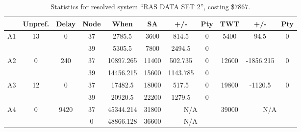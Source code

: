\begin{sidewaystable}
\footnotesize
\caption{Statistics for resolved system ``RAS DATA SET 2'', costing \$7867.}
\centering
\begin{tabular}{c||c|c||c|c|c|c|c||c|c|c}
  \hline \hline
  &
  Unpref. & 
  Delay &
  Node &
  When &
  SA &
  +/- &
  Pty &
  TWT &
  +/- &
  Pty \\
      \hline
      \multirow{2}{*}{A1} &
      \multirow{2}{*}{13} &
      \multirow{2}{*}{0} &
      37 &
      2785.5 &
      3600 &
        814.5 &
        0 &
      \multirow{2}{*}{5400} &
        \multirow{2}{*}{94.5} &
        \multirow{2}{*}{0}
      \\
      \cline{4-8}
       &
       &
       &
      39 &
      5305.5 &
      7800 &
        2494.5 &
        0 &
      
         &
        
      \\
      \hline
      \multirow{2}{*}{A2} &
      \multirow{2}{*}{0} &
      \multirow{2}{*}{240} &
      37 &
      10897.265 &
      11400 &
        502.735 &
        0 &
      \multirow{2}{*}{12600} &
        \multirow{2}{*}{-1856.215} &
        \multirow{2}{*}{0}
      \\
      \cline{4-8}
       &
       &
       &
      39 &
      14456.215 &
      15600 &
        1143.785 &
        0 &
      
         &
        
      \\
      \hline
      \multirow{2}{*}{A3} &
      \multirow{2}{*}{12} &
      \multirow{2}{*}{0} &
      37 &
      17482.5 &
      18000 &
        517.5 &
        0 &
      \multirow{2}{*}{19800} &
        \multirow{2}{*}{-1120.5} &
        \multirow{2}{*}{0}
      \\
      \cline{4-8}
       &
       &
       &
      39 &
      20920.5 &
      22200 &
        1279.5 &
        0 &
      
         &
        
      \\
      \hline
      \multirow{2}{*}{A4} &
      \multirow{2}{*}{0} &
      \multirow{2}{*}{9420} &
      37 &
      45344.214 &
      31800 &
        \multicolumn{2}{|c||}{N/A} &
      \multirow{2}{*}{39000} &
        \multicolumn{2}{c}{\multirow{2}{*}{N/A}}
      \\
      \cline{4-8}
       &
       &
       &
      0 &
      48866.128 &
      36600 &
        \multicolumn{2}{|c||}{N/A} &
      

\end{tabular}
\end{sidewaystable}
